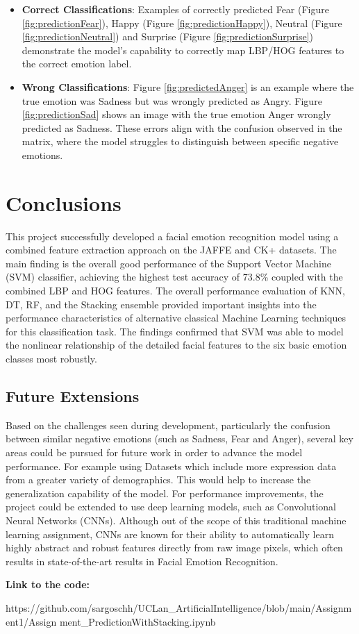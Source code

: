 \begin{itemize}
	\item \textbf{Correct Classifications}: Examples of correctly predicted Fear (Figure \ref{fig:predictionFear}), Happy (Figure \ref{fig:predictionHappy}), Neutral (Figure \ref{fig:predictionNeutral}) and Surprise (Figure \ref{fig:predictionSurprise}) demonstrate the model's capability to correctly map LBP/HOG features to the correct emotion label.
	\item \textbf{Wrong Classifications}: Figure \ref{fig:predictedAnger} is an example where the true emotion was Sadness but was wrongly predicted as Angry. Figure \ref{fig:predictionSad} shows an image with the true emotion Anger wrongly predicted as Sadness. These errors align with the confusion observed in the matrix, where the model struggles to distinguish between specific negative emotions.
\end{itemize}

\chapter{Conclusions}

This project successfully developed a facial emotion recognition model using a combined feature extraction approach on the JAFFE and CK+ datasets. The main finding is the overall good performance of the Support Vector Machine (SVM) classifier, achieving the highest test accuracy of 73.8\% coupled with the combined LBP and HOG features. The overall performance evaluation of KNN, DT, RF, and the Stacking ensemble provided important insights into the performance characteristics of alternative classical Machine Learning techniques for this classification task. The findings confirmed that SVM was able to model the nonlinear relationship of the detailed facial features to the six basic emotion classes most robustly.
\newline

\section{Future Extensions}

Based on the challenges seen during development, particularly the confusion between similar negative emotions (such as Sadness, Fear and Anger), several key areas could be pursued for future work in order to advance the model performance. For example using Datasets which include more expression data from a greater variety of demographics. This would help to increase the generalization capability of the model. 
For performance improvements, the project could be extended to use deep learning models, such as Convolutional Neural Networks (CNNs). Although out of the scope of this traditional machine learning assignment, CNNs are known for their ability to automatically learn highly abstract and robust features directly from raw image pixels, which often results in state-of-the-art results in Facial Emotion Recognition.

\textbf{Link to the code:}

https://github.com/sargoschh/UCLan\_ArtificialIntelligence/blob/main/Assignment1/Assign
ment\_PredictionWithStacking.ipynb
\newline